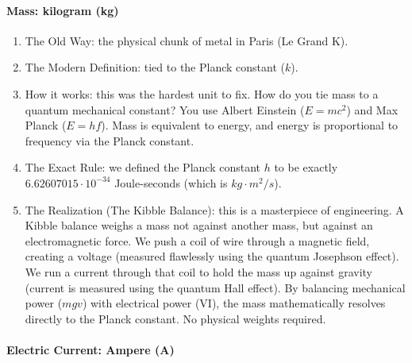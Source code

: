 \documentclass[../main.tex]{subfiles}
\begin{document}
\paragraph{Mass: kilogram (kg)}

\begin{enumerate}
	\item[\textbf{-}] The Old Way: the physical chunk of metal in Paris (Le Grand K).
	\item[\textbf{-}] The Modern Definition: tied to the Planck constant ($k$).
	\item[\textbf{-}] How it works: this was the hardest unit to fix. How do you tie mass to a quantum mechanical constant? You use Albert Einstein ($E = mc^2$) and Max Planck ($E = hf$). Mass is equivalent to energy, and energy is proportional to frequency via the Planck constant.
	\item[\textbf{-}] The Exact Rule: we defined the Planck constant $h$ to be exactly $6.62607015 \cdot 10^{-34}$  Joule-seconds (which is $\unit{kg} \cdot \unit{m^2 / s} $).
	\item[\textbf{-}] The Realization (The Kibble Balance): this is a masterpiece of engineering. A Kibble balance weighs a mass not against another mass, but against an electromagnetic force. We push a coil of wire through a magnetic field, creating a voltage (measured flawlessly using the quantum Josephson effect). We run a current through that coil to hold the mass up against gravity (current is measured using the quantum Hall effect). By balancing mechanical power ($mgv$) with electrical power (VI), the mass mathematically resolves directly to the Planck constant. No physical weights required.

\end{enumerate}

\paragraph{Electric Current: Ampere (A)}
\end{document}
